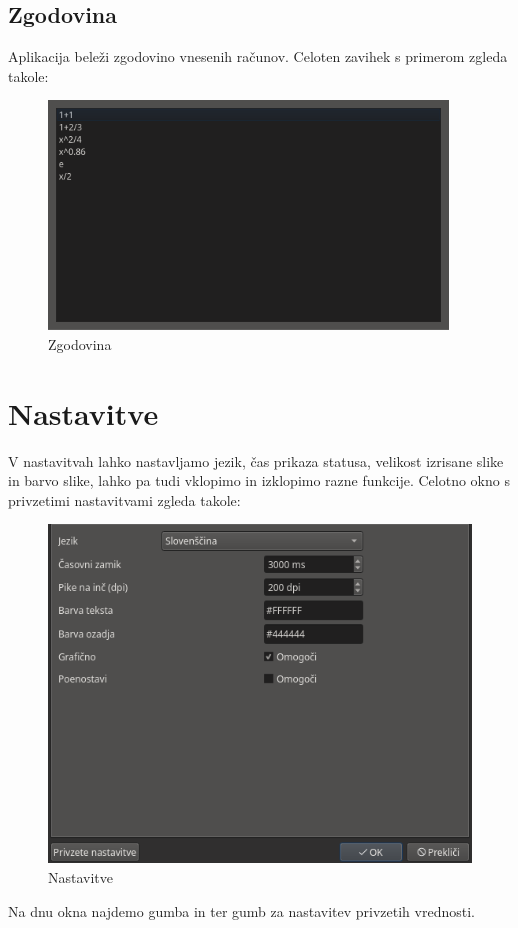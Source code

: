 \documentclass[12pt]{report}
\begin{document}
		\parbox{\textwidth}{
			\subsection{Zgodovina}
			Aplikacija beleži zgodovino vnesenih računov.
			Celoten zavihek s primerom zgleda takole:
			\begin{figure}[H]
				\centering
				\includegraphics[height=230px]{mw_hist.png}
				\caption{Zgodovina}
				\label{fig:mw_hist}
			\end{figure}}
	\parbox{\textwidth}{
	\section{Nastavitve}
		V nastavitvah lahko nastavljamo jezik, čas prikaza statusa, velikost izrisane slike in barvo slike, lahko pa tudi vklopimo in izklopimo razne funkcije.
		Celotno okno s privzetimi nastavitvami zgleda takole:
		\begin{figure}[H]
			\centering
			\includegraphics{settings.png}
			\caption{Nastavitve}
			\label{fig:settings}
		\end{figure}
		Na dnu okna najdemo gumba  in  ter gumb za nastavitev privzetih vrednosti.}
\end{document}
